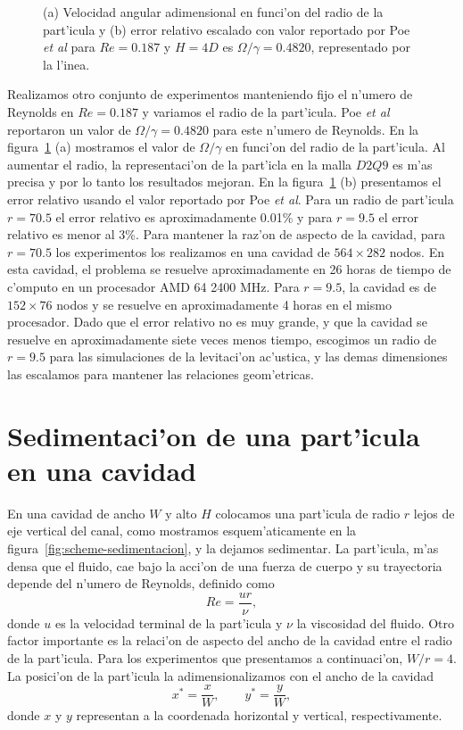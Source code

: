 \begin{figure}


\caption{\label{fig:radios}
(a) Velocidad angular adimensional en funci'on del radio de la part'icula y
(b) error relativo escalado con  valor reportado por Poe {\it et al} 
para $Re= 0.187$ y $H=4D$ es $\Omega/\gamma=0.4820$, representado por la l'inea.
}
\end{figure}

Realizamos otro conjunto de experimentos manteniendo fijo el n'umero de Reynolds
en $Re=0.187$ y variamos el radio de la part'icula. Poe {\it et al}~\cite{poe75} reportaron
un valor de  $\Omega/\gamma=0.4820$ para este n'umero de Reynolds.  En la 
figura~\ref{fig:radios} (a) mostramos el valor de  $\Omega/\gamma$ en funci'on del radio de la
part'icula. Al aumentar el radio, la representaci'on de la part'icla en la malla $D2Q9$ es m'as
precisa y  por lo tanto los resultados mejoran. En la figura~\ref{fig:radios} (b) presentamos el
error relativo usando el valor reportado por Poe {\it et al}. Para un radio de part'icula
$r=70.5$ el error relativo es aproximadamente 0.01\% y para $r=9.5$ el error relativo es menor 
al 3\%. Para mantener la raz'on de aspecto de la cavidad, para $r=70.5$ los experimentos los realizamos
en una cavidad de $564 \times 282$ nodos. En esta cavidad, el problema se resuelve aproximadamente
en 26 horas de tiempo de c'omputo en un procesador AMD 64 2400 MHz. Para $r=9.5$, la cavidad
es de $152 \times 76$ nodos y se resuelve en aproximadamente 4 horas en el mismo procesador.  
Dado que el error relativo no es muy grande, y que la cavidad se resuelve en aproximadamente 
siete veces menos tiempo, escogimos un radio de $r=9.5$ para las simulaciones de la levitaci'on 
ac'ustica, y las demas dimensiones las escalamos para mantener las relaciones geom'etricas.




\section{Sedimentaci'on de una part'icula en una cavidad}
\label{sec:sedimentacion}

En una cavidad de ancho $W$ y alto $H$ colocamos una part'icula
de radio $r$ lejos de eje vertical del canal, como mostramos  esquem'aticamente en la  
figura~\ref{fig:scheme-sedimentacion},
y la dejamos sedimentar. La part'icula, m'as densa que el fluido,  cae bajo la acci'on de una fuerza de cuerpo y
su trayectoria depende del n'umero de Reynolds, definido como
\begin{equation}
Re=\frac{ur}{\nu},
\end{equation} 
donde $u$ es la velocidad terminal de la part'icula y $\nu$ la viscosidad del fluido. 
Otro factor importante es la relaci'on de aspecto del ancho de la cavidad entre 
el radio de la part'icula. Para los experimentos que presentamos a continuaci'on,
$W/r=4$.  La posici'on de la part'icula la adimensionalizamos con el ancho de la cavidad
\begin{equation}
x^\ast=\frac{x}{W},\qquad y^\ast=\frac{y}{W},
\end{equation}
donde $x$ y $y$ representan a la coordenada horizontal y vertical, respectivamente.

